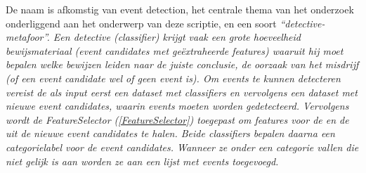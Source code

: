 {{De naam  is afkomstig van event detection, het centrale thema van 
het onderzoek onderliggend aan het onderwerp van deze scriptie, en een soort 
\it{``detective-metafoor''}. Een detective (\it{classifier}) krijgt vaak een grote 
hoeveelheid bewijsmateriaal (\it{event candidates met geëxtraheerde features}) waaruit 
hij moet bepalen welke bewijzen leiden naar de juiste conclusie, de oorzaak van 
het misdrijf (\it{of een event candidate wel of geen event is}).
\vl
Om events te kunnen detecteren vereist de  als input eerst een 
dataset met classifiers en vervolgens een dataset met nieuwe event candidates, 
waarin events moeten worden gedetecteerd.  
Vervolgens wordt de FeatureSelector (\ref{FeatureSelector}) toegepast om features voor de  
en de  uit de nieuwe event candidates te halen. Beide 
classifiers bepalen daarna een categorielabel voor de event candidates. Wanneer 
ze onder een categorie vallen die niet gelijk is aan  worden ze aan 
een lijst met events toegevoegd.

\label{EventDetectiveChart}

}}
